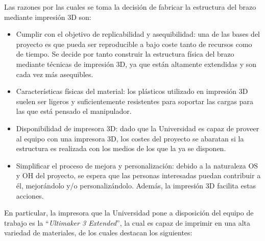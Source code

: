 Las razones por las cuales se toma la decisión de fabricar la estructura del brazo 
mediante impresión 3D son:

\begin{itemize}
  \item Cumplir con el objetivo de replicabilidad y asequibilidad: una de las bases 
  del proyecto es que pueda ser reproducible a bajo coste tanto de recursos como 
  de tiempo. Se decide por tanto construir la estructura física del brazo mediante 
  técnicas de impresión 3D, ya que están altamente extendidas y son cada vez más
  asequibles.
  
  \item Características físicas del material: los plásticos utilizado en impresión 3D
  suelen ser ligeros y suficientemente resistentes para soportar las cargas para las 
  que está pensado el manipulador.
  
  \item Disponibilidad de impresora 3D: dado que la Universidad es capaz de proveer 
  al equipo con una impresora 3D, los costes del proyecto se abaratan si la estructura
  es realizada con los medios de los que la ya se disponen.
  
  \item Simplificar el proceso de mejora y personalización: debido a la naturaleza
  \ac{OS} y \ac{OH} del proyecto, se espera que las personas interesadas puedan 
  contribuir a él, mejorándolo y/o personalizándolo. Además, la impresión 3D facilita
  estas acciones.
\end{itemize}

En particular, la impresora que la Universidad pone a disposición del equipo de 
trabajo es la ``\textit{Ultimaker 3 Extended}'', la cual es capaz de imprimir en una 
alta variedad de materiales, de los cuales destacan los siguientes:

